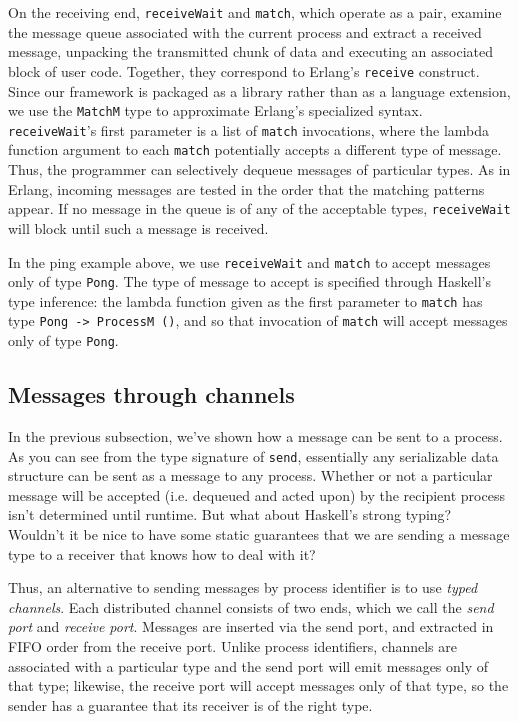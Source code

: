 \documentclass[preprint]{sigplanconf}
\begin{document}
\begin{itemize}
On the receiving end, \texttt{receiveWait} and \texttt{match}, which operate as a pair, examine the message queue associated with the current process and extract a received message, unpacking the transmitted chunk of data and executing an associated block of user code. Together, they correspond to Erlang's \texttt{receive} construct. Since our framework is packaged as a library rather than as a language extension, we use the \texttt{MatchM} type to approximate Erlang's specialized syntax. \texttt{receiveWait}'s first parameter is a list of \texttt{match} invocations, where the lambda function argument to each \texttt{match} potentially accepts a different type of message. Thus, the programmer can selectively dequeue messages of particular types. As in Erlang, incoming messages are tested in the order that the matching patterns appear. If no message in the queue is of any of the acceptable types, \texttt{receiveWait} will block until such a message is received. %

In the ping example above, we use \texttt{receiveWait} and \texttt{match} to accept messages only of type \texttt{Pong}. The type of message to accept is specified through Haskell's type inference: the lambda function given as the first parameter to \texttt{match} has type \lstinline!Pong -> ProcessM ()!, and so that invocation of \texttt{match} will accept messages only of type \texttt{Pong}.
\end{itemize}

\subsection{Messages through channels}
In the previous subsection, we've shown how a message can be sent to a process. As you can see from the type signature of \texttt{send}, essentially any serializable data structure can be sent as a message to any process. Whether or not a particular message will be accepted (i.e. dequeued and acted upon) by the recipient process isn't determined until runtime. But what about Haskell's strong typing? Wouldn't it be nice to have some static guarantees that we are sending a message type to a receiver that knows how to deal with it?

Thus, an alternative to sending messages by process identifier is to use {\em typed channels}. Each distributed channel consists of two ends, which we call the {\em send port} and {\em receive port}. Messages are inserted via the send port, and extracted in FIFO order from the receive port. Unlike process identifiers, channels are associated with a particular type and the send port will emit messages only of that type; likewise, the receive port will accept messages only of that type, so the sender has a guarantee that its receiver is of the right type.
\end{document}

